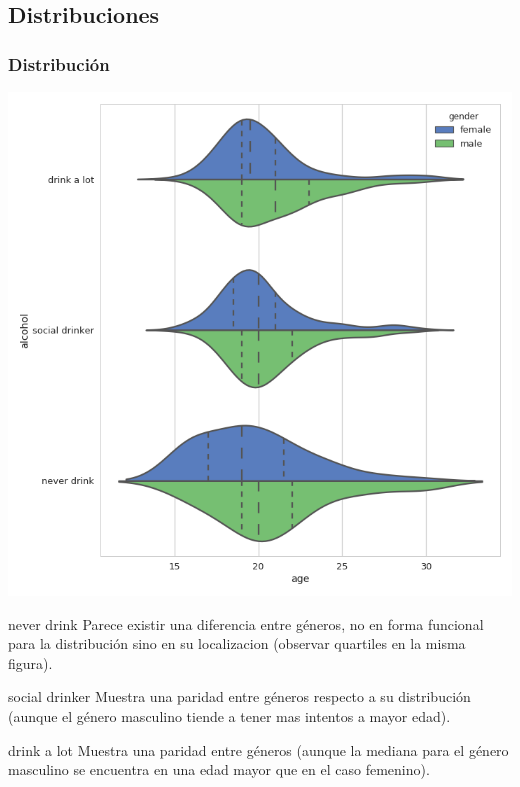 \documentclass[8pt]{beamer}
\begin{document}
\subsection{Distribuciones}
\begin{frame}\frametitle{Distribución}

\setlength{\columnsep}{80pt} 
\begin{multicols}{2}
\begin{minipage}[t]{.6\textwidth}
\includegraphics[scale=0.25]{alcohol_dist}
\end{minipage}
%
\begin{minipage}[t]{.4\textwidth}
\tiny{
\begin{block}{never drink}
Parece existir una diferencia entre géneros, no en forma funcional para la distribución 
sino en su localizacion (observar quartiles en la misma figura).
\end{block}
\pause
\begin{block}{social drinker}
Muestra una paridad entre géneros respecto a su distribución (aunque el género masculino tiende a tener mas intentos a mayor edad).
\end{block}
\pause
\begin{block}{drink a lot}
Muestra una paridad entre géneros (aunque la mediana para el género masculino se encuentra en una edad mayor que en el caso femenino).
\end{block}
}
\end{minipage}
\end{multicols}


\end{frame}
\end{document}
